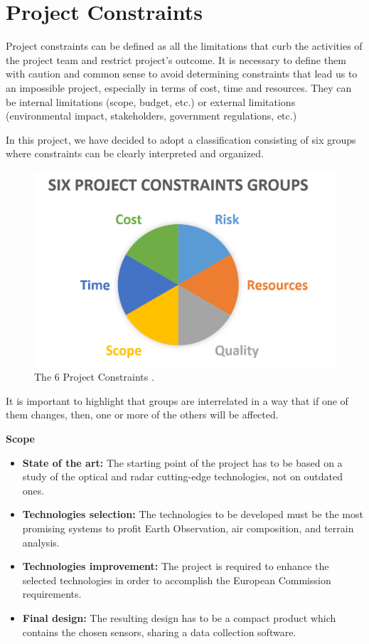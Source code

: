 \section{Project Constraints}

Project constraints can be defined as all the limitations that curb the activities of the project team and restrict project’s outcome. It is necessary to define them with caution and common sense to avoid determining constraints that lead us to an impossible project, especially in terms of cost, time and resources. They can be internal limitations (scope, budget, etc.) or external limitations (environmental impact, stakeholders, government regulations, etc.)

In this project, we have decided to adopt a classification consisting of six groups \cite{workfront2017} where constraints can be clearly interpreted and organized.

\begin{figure}[H]
	\centering
	\includegraphics[width=0.65\linewidth]{./images/constraints}
	\caption[The 6 Project Constraints]{The 6 Project Constraints \cite{workfront2017}.}
	\label{fig:constraints}
\end{figure}

It is important to highlight that groups are interrelated in a way that if one of them changes, then, one or more of the others will be affected.

\textbf{Scope}

\begin{itemize}
	
	\item \textbf{State of the art:} The starting point of the project has to be based on a study of the optical and radar cutting-edge technologies, not on outdated ones.
	
	\item \textbf{Technologies selection:} The technologies to be developed must be the most promising systems to profit Earth Observation, air composition, and terrain analysis.
	
	\item \textbf{Technologies improvement:} The project is required to enhance the selected technologies in order to accomplish the European Commission requirements.
	
	\item \textbf{Final design:} The resulting design has to be a compact product which contains the chosen sensors, sharing a data collection software.
	
\end{itemize}

